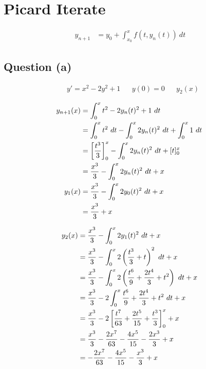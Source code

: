 \section{Picard Iterate}
	\begin{align}
		y_{n+1} &= y_{0} + \int_{x_{0}}^{x} f(t,y_{n}(t)) \ dt&
	\end{align}

	\subsection{Question (a)}
		\begin{align}
			&y' = x^{2} - 2y^{2} + 1&
			&y(0) = 0&
			&y_{2}(x)&
		\end{align}

		\begin{align}
			y_{n+1}(x) &= \int_{0}^{x} t^{2} - 2y_{n}(t)^{2} + 1 \ dt& \\
			&= \int_{0}^{x} t^{2} \ dt - \int_{0}^{x} 2y_{n}(t)^{2} \ dt + \int_{0}^{x} 1 \ dt& \notag \\
			&= \left[ \frac{t^{3}}{3} \right]_{0}^{x} - \int_{0}^{x} 2y_{n}(t)^{2} \ dt + [t]_{0}^{x}& \notag \\
			&= \frac{x^{3}}{3} - \int_{0}^{x} 2y_{n}(t)^{2} \ dt + x& \\
			y_{1}(x) &= \frac{x^{3}}{3} - \int_{0}^{x} 2y_{0}(t)^{2} \ dt + x& \\
			&= \frac{x^{3}}{3} + x&
		\end{align}

		\begin{align}
			y_{2}(x) &= \frac{x^{3}}{3} - \int_{0}^{x} 2y_{1}(t)^{2} \ dt + x& \\
			&= \frac{x^{3}}{3} - \int_{0}^{x} 2\left(\frac{t^{3}}{3} + t\right)^{2} \ dt + x& \notag \\
			&= \frac{x^{3}}{3} - \int_{0}^{x} 2\left(\frac{t^{6}}{9} + \frac{2t^{4}}{3} + t^{2}\right) \ dt + x& \notag \\
			&= \frac{x^{3}}{3} - 2\int_{0}^{x} \frac{t^{6}}{9} + \frac{2t^{4}}{3} + t^{2} \ dt + x& \notag \\
			&= \frac{x^{3}}{3} - 2\left[\frac{t^{7}}{63} + \frac{2t^{5}}{15} + \frac{t^{3}}{3}\right]_{0}^{x} + x& \notag \\
			&= \frac{x^{3}}{3} - \frac{2x^{7}}{63} - \frac{4x^{5}}{15} - \frac{2x^{3}}{3} + x& \notag \\
			&= - \frac{2x^{7}}{63} - \frac{4x^{5}}{15} - \frac{x^{3}}{3} + x&
		\end{align}

